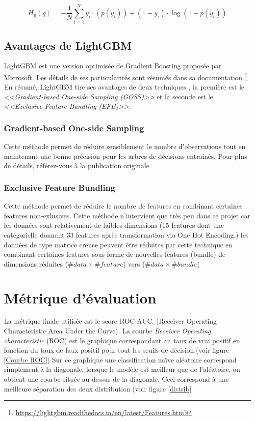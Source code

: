 		\begin{equation}
		\label{loss}
		H_p(q) = -\frac{1}{N} \sum_{i=1}^{N}y_i \cdot(p(y_i)) + (1 - y_i)\cdot \log(1 - p(y_i))
		\end{equation}
		
	\subsection{Avantages de LightGBM}
		LightGBM est une version optimisée de Gradient Boosting proposée par Microsoft. Les détails de
		ses particularités sont résumés dans sa documentation \footnote{\url{https://lightgbm.readthedocs.io/en/latest/Features.html}}
		En résumé, LightGBM tire ses avantages de deux techniques \cite{NIPS2017_6907}, la première est le \emph{<<Gradient-based One-side Sampling (GOSS)>>} et
		la seconde est le \emph{<<Exclusive Feature Bundling (EFB)>>}.
		
		\subsubsection{Gradient-based One-side Sampling}
		Cette méthode permet de réduire sensiblement le nombre d'observations tout en maintenant une bonne précision
		pour les arbres de décisions entrainés.
		Pour plus de détails, référez-vous à la publication originale \cite{NIPS2017_6907}
		
		\subsubsection{Exclusive Feature Bundling}
		Cette méthode permet de réduire le nombre de features en combinant certaines features non-exlusives.
		Cette méthode n'intervient que très peu dans ce projet car les données sont relativement de faibles
		dimensions (15 features dont une catégorielle donnant 33 features après transformation via One Hot Encoding.) les données
		de type matrice creuse peuvent être réduites par cette technique en combinant certaines features
		sous forme de nouvelles features (bundle) de dimensions réduites ($\#data \times \#feature$) vers ($\#data \times \#bundle$) 
	

\section{Métrique d'évaluation}
	La métrique finale utilisée est le score ROC AUC. (Receiver Operating Characteristic Area Under the Curve). \cite{ROC_AUC}
	La courbe \emph{Receiver Operating characteristic} (ROC) est le graphique correspondant au taux de vrai positif
	en fonction du taux de faux positif pour tout les seuils de décision.(voir figure \ref{Courbe ROC}) 
	Sur ce graphique une classification naïve aléatoire correspond simplement
	à la diagonale, lorsque le modèle est meilleur que de l'aléatoire, on obtient une courbe située au-dessus
	de la diagonale. Ceci correspond à une meilleure séparation des deux distribution (voir figure \ref{distrib}
	
